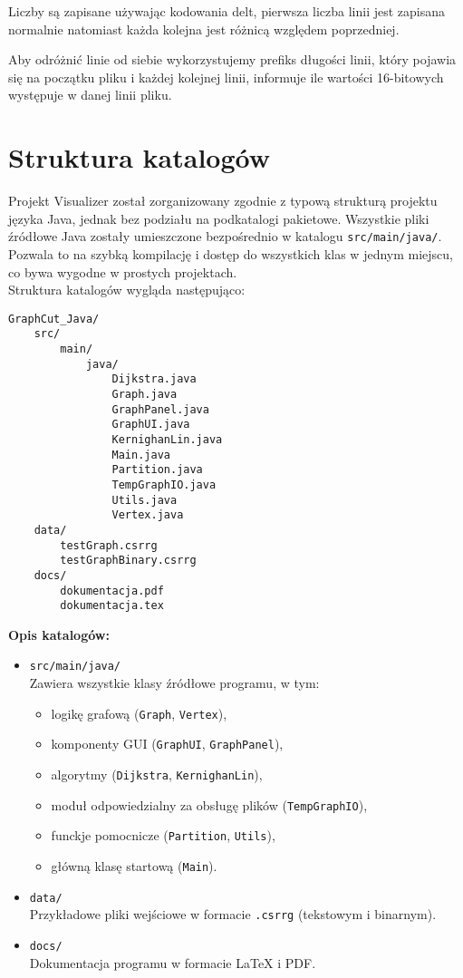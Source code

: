 \documentclass[a4paper,12pt]{article}
\begin{document}
Liczby są zapisane używając kodowania delt, pierwsza liczba linii jest zapisana normalnie natomiast każda kolejna jest różnicą względem poprzedniej.

Aby odróżnić linie od siebie wykorzystujemy prefiks długości linii, który pojawia się na początku pliku i każdej kolejnej linii, informuje ile wartości 16-bitowych występuje w danej linii pliku.


\section{Struktura katalogów}
Projekt Visualizer został zorganizowany zgodnie z typową strukturą projektu języka Java, jednak bez podziału na podkatalogi pakietowe. Wszystkie pliki źródłowe Java zostały umieszczone bezpośrednio w katalogu \texttt{src/main/java/}. Pozwala to na szybką kompilację i dostęp do wszystkich klas w jednym miejscu, co bywa wygodne w prostych projektach. \\
Struktura katalogów wygląda następująco:
\begin{lstlisting}
GraphCut_Java/
    src/
        main/
            java/
                Dijkstra.java
                Graph.java
                GraphPanel.java
                GraphUI.java
                KernighanLin.java
                Main.java
                Partition.java
                TempGraphIO.java
                Utils.java
                Vertex.java
    data/
        testGraph.csrrg
        testGraphBinary.csrrg
    docs/
        dokumentacja.pdf
        dokumentacja.tex
\end{lstlisting}
\textbf{Opis katalogów:}
\begin{itemize}
    \item \texttt{src/main/java/} \\
    Zawiera wszystkie klasy źródłowe programu, w tym:
    \begin{itemize}
        \item logikę grafową (\texttt{Graph}, \texttt{Vertex}),
        \item komponenty GUI (\texttt{GraphUI}, \texttt{GraphPanel}),
        \item algorytmy (\texttt{Dijkstra}, \texttt{KernighanLin}),
        \item moduł odpowiedzialny za obsługę plików (\texttt{TempGraphIO}),
        \item funckje pomocnicze (\texttt{Partition}, \texttt{Utils}),
        \item główną klasę startową (\texttt{Main}).
    \end{itemize}
    \item \texttt{data/} \\
    Przykładowe pliki wejściowe w formacie \texttt{.csrrg} (tekstowym i binarnym).
    \item \texttt{docs/} \\
    Dokumentacja programu w formacie LaTeX i PDF.
\end{itemize}
\end{document}
